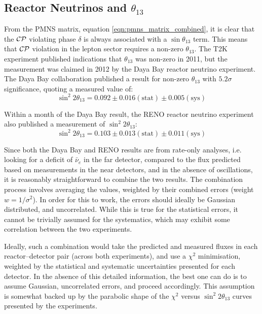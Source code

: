 \subsection{Reactor Neutrinos and $\theta_{13}$}
From the PMNS matrix, equation \eqref{eqn:pmns_matrix_combined}, it is clear that the $\mathcal{C}\mathcal{P}$ violating phase $\delta$ is always associated with a $\sin\theta_{13}$ term. This means that $\mathcal{C}\mathcal{P}$ violation in the lepton sector requires a non-zero $\theta_{13}$. The T2K\citep{Abe2011} experiment published indications that $\theta_{13}$ was non-zero in 2011, but the measurement was claimed in 2012 by the Daya Bay reactor neutrino experiment. The Daya Bay collaboration published a result for non-zero $\theta_{13}$ with $5.2\sigma$ significance\citep{An2012}, quoting a measured value of:
\begin{equation}\label{eqn:reactor_parameters_dyb}
\sin^2 2\theta_{13} = 0.092 \pm 0.016 (\mathrm{stat}) \pm 0.005 (\mathrm{sys})
\end{equation}

Within a month of the Daya Bay result, the RENO reactor neutrino experiment also published a measurement of $\sin^2 2\theta_{13}$\citep{Ahn2012}:
\begin{equation}\label{eqn:reactor_parameters_reno}
\sin^2 2\theta_{13} = 0.103 \pm 0.013 (\mathrm{stat}) \pm 0.011 (\mathrm{sys})
\end{equation}

Since both the Daya Bay and RENO results are from rate-only analyses, i.e. looking for a deficit of $\bar{\nu}_e$ in the far detector, compared to the flux predicted based on measurements in the near detectors, and in the absence of oscillations, it is reasonably straightforward to combine the two results. The combination process involves averaging the values, weighted by their combined errors (weight $w = 1/\sigma^2$). In order for this to work, the errors should ideally be Gaussian distributed, and uncorrelated. While this is true for the statistical errors, it cannot be trivially assumed for the systematics, which may exhibit some correlation between the two experiments.

Ideally, such a combination would take the predicted and measured fluxes in each reactor--detector pair (across both experiments), and use a $\chi^2$ minimisation, weighted by the statistical and systematic uncertainties presented for each detector. In the absence of this detailed information, the best one can do is to assume Gaussian, uncorrelated errors, and proceed accordingly. This assumption is somewhat backed up by the parabolic shape of the $\chi^2$ versus $\sin^2 2\theta_{13}$ curves presented by the experiments\citep{An2012, Ahn2012}.

